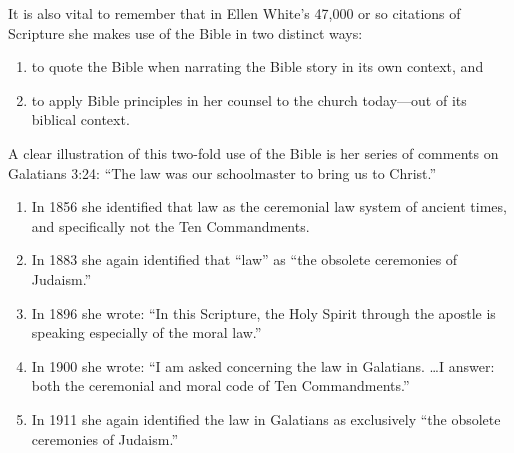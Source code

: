 It is also vital to remember that in Ellen White's 47,000 or so citations
of Scripture she makes use of the Bible in two distinct ways:
\begin{enumerate}
        \item to quote the Bible when narrating the Bible story in its own
            context, and
        \item to apply Bible principles in her counsel to the church today---out
            of its biblical context. 
\end{enumerate}
\newpage
A clear illustration of this two-fold use of the Bible is her series of
comments on Galatians 3:24: ``The law was our schoolmaster to bring us to
Christ.''
\begin{enumerate}
        \item In 1856 she identified that law as the ceremonial law system of
ancient times, and specifically not the Ten Commandments.
        \item In 1883 she
        again identified that ``law'' as ``the obsolete ceremonies of 
        Judaism.''
        \item In 1896 she wrote: ``In this Scripture, the Holy Spirit through the apostle
            is speaking especially of the moral law.''
        \item In 1900 she wrote: ``I am
asked concerning the law in Galatians. \ldots I answer: both the ceremonial and
        moral code of Ten Commandments.''
    \item In 1911 she again identified the law
        in Galatians as exclusively ``the obsolete ceremonies of 
        Judaism.''
\end{enumerate}

